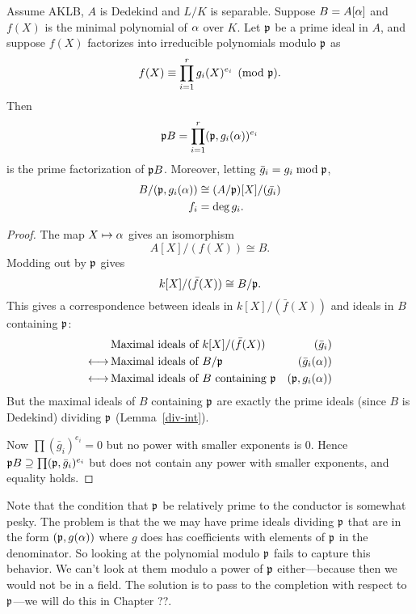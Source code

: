 \begin{thm}
Assume AKLB, $A$ is Dedekind and $L/K$ is separable. 
Suppose $B=A[\alpha]$ and $f(X)$ is the minimal polynomial of $\alpha$ over $K$. Let $\mathfrak{p}$ be a prime ideal in $A$, and suppose $f(X)$ factorizes into irreducible polynomials modulo $\mathfrak{p}$ as
\[
f(X)\equiv \prod_{i=1}^r g_i(X)^{e_i}\pmod{\mathfrak{p}}.
\]
Then
\[
\mathfrak{p} B=\prod_{i=1}^r (\mathfrak{p}, g_i(\alpha))^{e_i}
\]
is the prime factorization of $\mathfrak{p} B$. Moreover, letting $\bar{g}_i=g_i\bmod{\mathfrak{p}}$,
\begin{align*}
B/(\mathfrak{p}, g_i(\alpha))&\cong (A/\mathfrak{p})[X]/(\bar{g_i})\\
f_i&=\deg g_i.
\end{align*}
\end{thm}
\begin{proof}
The map $X\mapsto \alpha$ gives an isomorphism
\[
A[X]/(f(X))\cong B.
\]
Modding out by $\mathfrak{p}$ gives
\[
k[X]/(\bar{f}(X))\cong B/\mathfrak{p}.
\]
This gives a correspondence between ideals in $k[X]/(\bar{f}(X))$ and ideals in $B$ containing $\mathfrak{p}$:
\begin{align*}
&\text{Maximal ideals of }k[X]/(\bar{f}(X))& (\bar{g}_i)\\
\longleftrightarrow \,&\text{Maximal ideals of }B/\mathfrak{p}& (\bar{g}_i(\alpha))\\
\longleftrightarrow \,&\text{Maximal ideals of }B \text{ containing }\mathfrak{p}& (\mathfrak{p}, g_i(\alpha))
\end{align*}
But the maximal ideals of $B$ containing $\mathfrak{p}$ are exactly the prime ideals (since $B$ is Dedekind) dividing $\mathfrak{p}$ (Lemma~\ref{div-int}).

Now $\prod (\bar{g}_i)^{e_i}=0$ but no power with smaller exponents is 0. Hence $\mathfrak{p} B\supseteq \prod (\mathfrak{p},\bar{g}_i)^{e_i}$ but does not contain any power with smaller exponents, and equality holds.
\end{proof}
Note that the condition that $\mathfrak{p}$ be relatively prime to the conductor is somewhat pesky. The problem is that the we may have prime ideals dividing $\mathfrak{p}$ that are in the form $(\mathfrak{p}, g(\alpha))$ where $g$ does has coefficients with elements of $\mathfrak{p}$ in the denominator. So looking at the polynomial modulo $\mathfrak{p}$ fails to capture this behavior. We can't look at them modulo a power of $\mathfrak{p}$ either---because then we would not be in a field. The solution is to pass to the completion with respect to $\mathfrak{p}$---we will do this in Chapter ??.
